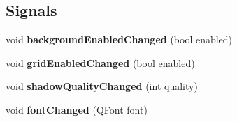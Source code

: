 \subsection*{Signals}
\begin{DoxyCompactItemize}
\item 
void {\bfseries background\+Enabled\+Changed} (bool enabled)\hypertarget{class_scatter_data_modifier_ad95344ac8e42562517af82279348c146}{}\label{class_scatter_data_modifier_ad95344ac8e42562517af82279348c146}

\item 
void {\bfseries grid\+Enabled\+Changed} (bool enabled)\hypertarget{class_scatter_data_modifier_ae98a57da35a1354df2a4fd700cd2538a}{}\label{class_scatter_data_modifier_ae98a57da35a1354df2a4fd700cd2538a}

\item 
void {\bfseries shadow\+Quality\+Changed} (int quality)\hypertarget{class_scatter_data_modifier_adae4638a2e3c43a6fb16a788913a136c}{}\label{class_scatter_data_modifier_adae4638a2e3c43a6fb16a788913a136c}

\item 
void {\bfseries font\+Changed} (Q\+Font font)\hypertarget{class_scatter_data_modifier_aa0815d6660dc3e8530967220783abe87}{}\label{class_scatter_data_modifier_aa0815d6660dc3e8530967220783abe87}

\end{DoxyCompactItemize}
